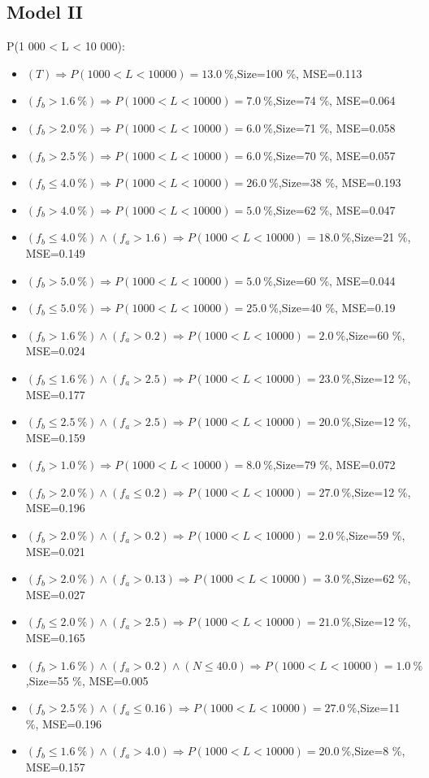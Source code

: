\documentclass[numbered]{CSL}
\begin{document}
\subsection{Model II}
P(1 000 < L < 10 000):
\begin{itemize}
\item $(T) \Rightarrow P(1 000 < L < 10 000) = 13.0~\%$,\hfill Size=100 \%, MSE=0.113
\item $(f_b > 1.6~\%) \Rightarrow P(1 000 < L < 10 000) = 7.0~\%$,\hfill Size=74 \%, MSE=0.064
\item $(f_b > 2.0~\%) \Rightarrow P(1 000 < L < 10 000) = 6.0~\%$,\hfill Size=71 \%, MSE=0.058
\item $(f_b > 2.5~\%) \Rightarrow P(1 000 < L < 10 000) = 6.0~\%$,\hfill Size=70 \%, MSE=0.057
\item $(f_b \leq 4.0~\%) \Rightarrow P(1 000 < L < 10 000) = 26.0~\%$,\hfill Size=38 \%, MSE=0.193
\item $(f_b > 4.0~\%) \Rightarrow P(1 000 < L < 10 000) = 5.0~\%$,\hfill Size=62 \%, MSE=0.047
\item $(f_b \leq 4.0~\%) \land (f_a > 1.6) \Rightarrow P(1 000 < L < 10 000) = 18.0~\%$,\hfill Size=21 \%, MSE=0.149
\item $(f_b > 5.0~\%) \Rightarrow P(1 000 < L < 10 000) = 5.0~\%$,\hfill Size=60 \%, MSE=0.044
\item $(f_b \leq 5.0~\%) \Rightarrow P(1 000 < L < 10 000) = 25.0~\%$,\hfill Size=40 \%, MSE=0.19
\item $(f_b > 1.6~\%) \land (f_a > 0.2) \Rightarrow P(1 000 < L < 10 000) = 2.0~\%$,\hfill Size=60 \%, MSE=0.024
\item $(f_b \leq 1.6~\%) \land (f_a > 2.5) \Rightarrow P(1 000 < L < 10 000) = 23.0~\%$,\hfill Size=12 \%, MSE=0.177
\item $(f_b \leq 2.5~\%) \land (f_a > 2.5) \Rightarrow P(1 000 < L < 10 000) = 20.0~\%$,\hfill Size=12 \%, MSE=0.159
\item $(f_b > 1.0~\%) \Rightarrow P(1 000 < L < 10 000) = 8.0~\%$,\hfill Size=79 \%, MSE=0.072
\item $(f_b > 2.0~\%) \land (f_a \leq 0.2) \Rightarrow P(1 000 < L < 10 000) = 27.0~\%$,\hfill Size=12 \%, MSE=0.196
\item $(f_b > 2.0~\%) \land (f_a > 0.2) \Rightarrow P(1 000 < L < 10 000) = 2.0~\%$,\hfill Size=59 \%, MSE=0.021
\item $(f_b > 2.0~\%) \land (f_a > 0.13) \Rightarrow P(1 000 < L < 10 000) = 3.0~\%$,\hfill Size=62 \%, MSE=0.027
\item $(f_b \leq 2.0~\%) \land (f_a > 2.5) \Rightarrow P(1 000 < L < 10 000) = 21.0~\%$,\hfill Size=12 \%, MSE=0.165
\item $(f_b > 1.6~\%) \land (f_a > 0.2) \land (N \leq 40.0) \Rightarrow P(1 000 < L < 10 000) = 1.0~\%$,\hfill Size=55 \%, MSE=0.005
\item $(f_b > 2.5~\%) \land (f_a \leq 0.16) \Rightarrow P(1 000 < L < 10 000) = 27.0~\%$,\hfill Size=11 \%, MSE=0.196
\item $(f_b \leq 1.6~\%) \land (f_a > 4.0) \Rightarrow P(1 000 < L < 10 000) = 20.0~\%$,\hfill Size=8 \%, MSE=0.157
\end{itemize}
\end{document}
